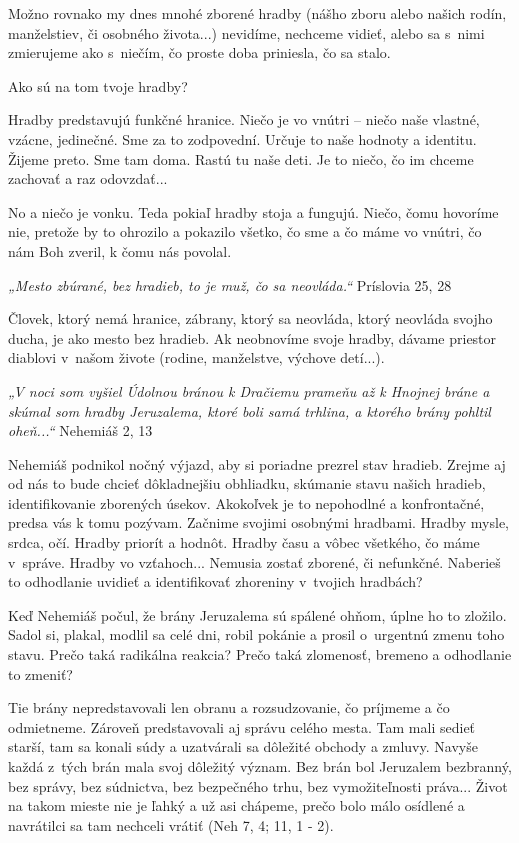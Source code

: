 Možno rovnako my dnes mnohé zborené hradby (nášho zboru alebo našich rodín, manželstiev, či osobného života...) nevidíme, nechceme vidieť, alebo sa s~nimi zmierujeme ako s~niečím, čo proste doba priniesla, čo sa stalo.

Ako sú na tom tvoje hradby?

Hradby predstavujú funkčné hranice. Niečo je vo vnútri – niečo naše vlastné, vzácne, jedinečné. Sme za to zodpovední. Určuje to naše hodnoty a identitu. Žijeme preto. Sme tam doma. Rastú tu naše deti. Je to niečo, čo im chceme zachovať a raz odovzdať...

No a niečo je vonku. Teda pokiaľ hradby stoja a fungujú. Niečo, čomu hovoríme nie, pretože by to ohrozilo a pokazilo všetko, čo sme a čo máme vo vnútri, čo nám Boh zveril, k čomu nás povolal.

{\it „Mesto zbúrané, bez hradieb, to je muž, čo sa neovláda.“} 	Príslovia 25, 28

Človek, ktorý nemá hranice, zábrany, ktorý sa neovláda, ktorý neovláda svojho ducha, je ako mesto bez hradieb. Ak neobnovíme svoje hradby, dávame priestor diablovi v~našom živote (rodine, manželstve, výchove detí...).

{\it „V noci som vyšiel Údolnou bránou k Dračiemu prameňu až k Hnojnej bráne a skúmal som hradby Jeruzalema, ktoré boli samá trhlina, a ktorého brány pohltil oheň...“} Nehemiáš 2, 13

Nehemiáš podnikol nočný výjazd, aby si poriadne prezrel stav hradieb. Zrejme aj od nás to bude chcieť dôkladnejšiu obhliadku, skúmanie stavu našich hradieb, identifikovanie zborených úsekov. Akokoľvek je to nepohodlné a konfrontačné, predsa vás k tomu pozývam. Začnime svojimi osobnými hradbami. Hradby mysle, srdca, očí. Hradby priorít a hodnôt. Hradby času a vôbec všetkého, čo máme v~správe. Hradby vo vzťahoch... Nemusia zostať zborené, či nefunkčné. Naberieš to odhodlanie uvidieť a identifikovať zhoreniny v~tvojich hradbách?

Keď Nehemiáš počul, že brány Jeruzalema sú spálené ohňom, úplne ho to zložilo. Sadol si, plakal, modlil sa celé dni, robil pokánie a prosil o~urgentnú zmenu toho stavu. Prečo taká radikálna reakcia? Prečo taká zlomenosť, bremeno a odhodlanie to zmeniť?

Tie brány nepredstavovali len obranu a rozsudzovanie, čo príjmeme a čo odmietneme. Zároveň predstavovali aj správu celého mesta. Tam mali sedieť starší, tam sa konali súdy a uzatvárali sa dôležité obchody a zmluvy. Navyše každá z~tých brán mala svoj dôležitý význam. Bez brán bol Jeruzalem bezbranný, bez správy, bez súdnictva, bez bezpečného trhu, bez vymožiteľnosti práva... Život na takom mieste nie je ľahký a už asi chápeme, prečo bolo málo osídlené a navrátilci sa tam nechceli vrátiť (Neh 7, 4; 11, 1 - 2).

